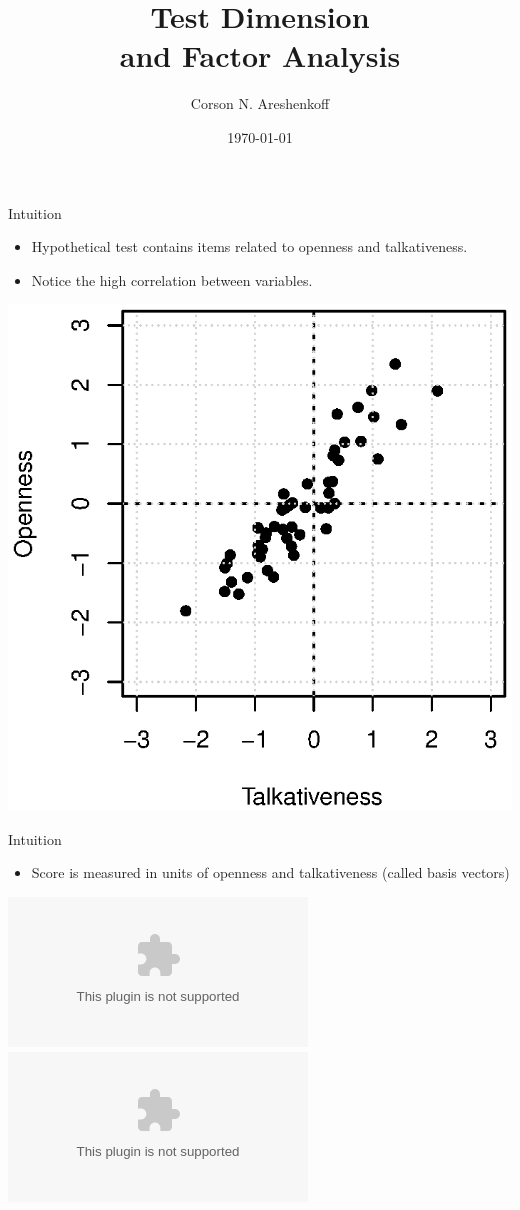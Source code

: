 \documentclass{beamer}
\title{Test Dimension\\and Factor Analysis}
\date{\today}
\author{Corson N. Areshenkoff}
\institute{University of Victoria}
\begin{document}
\maketitle

\begin{frame}{Intuition}
	\begin{minipage}{0.47\textwidth}
    		\begin{itemize}
        		\item Hypothetical test contains items related to openness and talkativeness.
			\item Notice the high correlation between variables.
    		\end{itemize}
	\end{minipage}
	\begin{minipage}{0.5\textwidth}
    		\begin{center}
        		\includegraphics[scale=.6, left]{figures/pca1.eps}
    		\end{center}
	\end{minipage}
\end{frame}

\begin{frame}{Intuition}
	\begin{minipage}{0.47\textwidth}
    		\begin{itemize}
        		\item Score is measured in units of openness and talkativeness (called basis 
				  vectors)
    		\end{itemize}
	\end{minipage}
	\begin{minipage}{0.5\textwidth}
    		\begin{center}
        		\includegraphics<1>[scale=.6, left]{figures/pca2.eps}
			\includegraphics<2>[scale=.6, left]{figures/pca3.eps}
    		\end{center}
	\end{minipage}
\end{frame}
\end{document}

